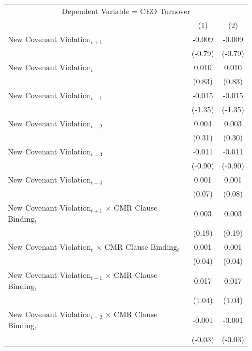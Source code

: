 {
\def\sym#1{\ifmmode^{#1}\else\(^{#1}\)\fi}
\begin{tabular}{l*{2}{c}}
\toprule \multicolumn{3}{c}{Dependent Variable = CEO Turnover} \\ 
                &\multicolumn{1}{c}{(1)}         &\multicolumn{1}{c}{(2)}         \\

\midrule New Covenant Violation$ _{t+1} $&   -0.009         &   -0.009         \\
                &  (-0.79)         &  (-0.79)         \\
New Covenant Violation$ _{t}$&    0.010         &    0.010         \\
                &   (0.83)         &   (0.83)         \\
New Covenant Violation$ _{t-1}$&   -0.015         &   -0.015         \\
                &  (-1.35)         &  (-1.35)         \\
New Covenant Violation$ _{t-2}$&    0.004         &    0.003         \\
                &   (0.31)         &   (0.30)         \\
New Covenant Violation$ _{t-3}$&   -0.011         &   -0.011         \\
                &  (-0.90)         &  (-0.90)         \\
New Covenant Violation$ _{t-4}$&    0.001         &    0.001         \\
                &   (0.07)         &   (0.08)         \\
New Covenant Violation$ _{t+1}$  $ \times $ CMR Clause Binding$ _t $&    0.003         &    0.003         \\
                &   (0.19)         &   (0.19)         \\
New Covenant Violation$ _{t}$    $ \times $ CMR Clause Binding$ _t $&    0.001         &    0.001         \\
                &   (0.04)         &   (0.04)         \\
New Covenant Violation$ _{t-1}$  $ \times $ CMR Clause Binding$ _t $&    0.017         &    0.017         \\
                &   (1.04)         &   (1.04)         \\
New Covenant Violation$ _{t-2}$  $ \times $ CMR Clause Binding$ _t $&   -0.001         &   -0.001         \\
                &  (-0.03)         &  (-0.03)         \\

\end{tabular}}
